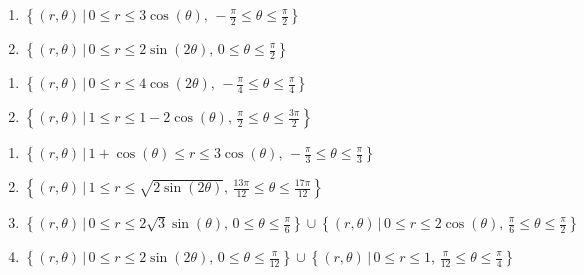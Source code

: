 \documentclass{ximera}
\begin{document}
\begin{multicols}{2} 

\begin{enumerate}

\setcounter{enumi}{\value{HW}}

\item $\left\{ (r,\theta) \, | \, 0 \leq r \leq 3\cos(\theta), \, -\frac{\pi}{2} \leq \theta \leq \frac{\pi}{2} \right\}$
\item $\left\{ (r,\theta) \, | \, 0 \leq r \leq 2\sin(2\theta), \,0 \leq \theta \leq \frac{\pi}{2} \right\}$

\setcounter{HW}{\value{enumi}}

\end{enumerate}

\end{multicols}

\begin{multicols}{2} 

\begin{enumerate}

\setcounter{enumi}{\value{HW}}

\item $\left\{ (r,\theta) \, | \, 0 \leq r \leq 4\cos(2\theta), \, -\frac{\pi}{4} \leq \theta \leq \frac{\pi}{4} \right\}$
\item $\left\{ (r,\theta) \, | \, 1 \leq r \leq 1-2\cos(\theta), \, \frac{\pi}{2} \leq \theta \leq \frac{3\pi}{2} \right\}$

\setcounter{HW}{\value{enumi}}

\end{enumerate}

\end{multicols}

\begin{enumerate}

\setcounter{enumi}{\value{HW}}

\item $\left\{ (r,\theta) \, | \, 1 + \cos(\theta) \leq r \leq 3\cos(\theta), \, -\frac{\pi}{3} \leq \theta \leq \frac{\pi}{3} \right\}$
\item $\left\{ (r,\theta) \, | \, 1 \leq r \leq \sqrt{2\sin(2\theta)}, \, \frac{13\pi}{12} \leq \theta \leq \frac{17\pi}{12} \right\}$
\item  $\left\{ (r,\theta) \, | \, 0 \leq r \leq 2\sqrt{3} \sin(\theta), \, 0 \leq \theta \leq \frac{\pi}{6} \right\} \cup \left\{ (r,\theta) \, | \, 0 \leq r \leq 2\cos(\theta), \, \frac{\pi}{6}  \leq \theta \leq \frac{\pi}{2} \right\}$
\item  $\left\{ (r,\theta) \, | \, 0 \leq r \leq 2 \sin(2\theta), \, 0 \leq \theta \leq \frac{\pi}{12} \right\} \cup \left\{ (r,\theta) \, | \, 0 \leq r \leq 1, \, \frac{\pi}{12}  \leq \theta \leq \frac{\pi}{4} \right\}$ \label{regionsketchlast}

\setcounter{HW}{\value{enumi}}

\end{enumerate}
\end{document}
